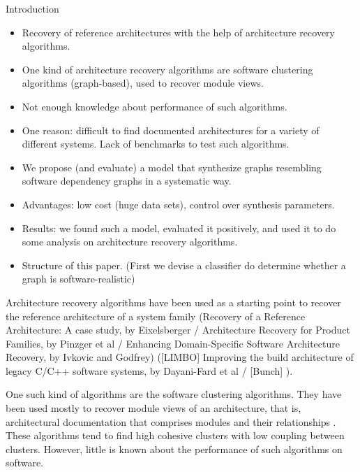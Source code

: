 \documentclass[11pt,twocolumn,a4paper,english]{article}
\begin{document}

\begin{section}{Introduction}

	\begin{itemize}
		\item Recovery of reference architectures with the help of architecture recovery algorithms. 
		\item One kind of architecture recovery algorithms are software clustering algorithms (graph-based),  used to
recover module views.
		\item Not enough knowledge about performance of such algorithms.
		\item One reason: difficult to find documented architectures for a variety of different systems. Lack of benchmarks to test such algorithms.
		\item We propose (and evaluate) a model that synthesize graphs resembling software dependency graphs in a systematic way.
		\item Advantages: low cost (huge data sets), control over synthesis parameters.
		\item Results: we found such a model, evaluated it positively, and used it to do some analysis on architecture recovery algorithms.
		\item Structure of this paper. (First we devise a classifier do determine whether a graph is software-realistic)
	\end{itemize}
		
Architecture recovery algorithms have been used as a starting point to recover the reference architecture of a system family (Recovery of a Reference Architecture: A case study, by Eixelsberger / Architecture Recovery for Product Families, by Pinzger et al / Enhancing Domain-Specific Software Architecture Recovery, by Ivkovic and Godfrey) 
	([LIMBO] Improving the build architecture of legacy C/C++ software systems, by Dayani-Fard et al / [Bunch] ).
	
	One such kind of algorithms are the software clustering algorithms. They have been used mostly to recover module views of an architecture, that is, architectural documentation that comprises modules and their relationships \cite{Clements2002}. These algorithms tend to find high cohesive clusters with low coupling between clusters. However, little is known about the performance of such algorithms on software. 
	
\end{section}
\end{document}
